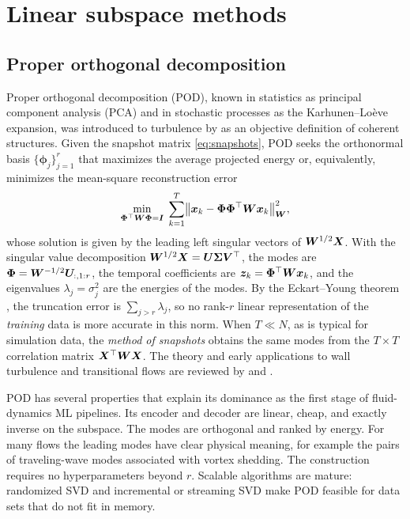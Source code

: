 \section{Linear subspace methods}
\label{sec:linear}

\subsection{Proper orthogonal decomposition}
\label{sec:pod}

Proper orthogonal decomposition (POD), known in statistics as principal
component analysis (PCA) \parencite{pearson1901,hotelling1933} and in stochastic
processes as the Karhunen--Lo\`eve expansion, was introduced to turbulence by
\textcite{lumley1967} as an objective definition of coherent structures. Given
the snapshot matrix \eqref{eq:snapshots}, POD seeks the orthonormal basis
$\{\bm{\phi}_j\}_{j=1}^{r}$ that maximizes the average projected energy or,
equivalently, minimizes the mean-square reconstruction error
\begin{equation}
  \min_{\bm{\Phi}^{\top}\bm{W}\bm{\Phi}=\bm{I}}\;\sum_{k=1}^{T}\bigl\|\bm{x}_k-\bm{\Phi}\bm{\Phi}^{\top}\bm{W}\bm{x}_k\bigr\|_{\bm{W}}^{2},
  \label{eq:pod}
\end{equation}
whose solution is given by the leading left singular vectors of
$\bm{W}^{1/2}\bm{X}$. With the singular value decomposition
$\bm{W}^{1/2}\bm{X}=\bm{U}\bm{\Sigma}\bm{V}^{\top}$, the modes are
$\bm{\Phi}=\bm{W}^{-1/2}\bm{U}_{:,1:r}$, the temporal coefficients are
$\bm{z}_k=\bm{\Phi}^{\top}\bm{W}\bm{x}_k$, and the eigenvalues $\lambda_j=\sigma_j^2$ are the
energies of the modes. By the Eckart--Young theorem \parencite{eckart1936},
the truncation error is $\sum_{j>r}\lambda_j$, so no rank-$r$ linear
representation of the \emph{training} data is more accurate in this norm. When
$T\ll N$, as is typical for simulation data, the \emph{method of snapshots}
\parencite{sirovich1987} obtains the same modes from the $T\times T$
correlation matrix $\bm{X}^{\top}\bm{W}\bm{X}$. The theory and early applications to wall
turbulence and transitional flows are reviewed by \textcite{berkooz1993} and
\textcite{holmes2012turbulence}.

POD has several properties that explain its dominance as the first stage of
fluid-dynamics ML pipelines. Its encoder and decoder are linear, cheap, and
exactly inverse on the subspace. The modes are orthogonal and ranked by
energy. For many flows the leading modes have clear physical meaning, for
example the pairs of traveling-wave modes associated with vortex shedding. The
construction requires no hyperparameters beyond $r$. Scalable algorithms are
mature: randomized SVD \parencite{halko2011} and incremental or streaming SVD
\parencite{levy2000,brand2006} make POD feasible for data sets that do not fit
in memory.

